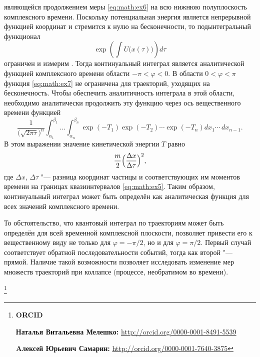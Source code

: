 являющейся продолжением меры \eqref{eq:math:ex6} на всю нижнюю полуплоскость комплексного времени. Поскольку потенциальная энергия является непрерывной функцией координат и стремится к нулю на бесконечности, то подынтегральный функционал $$\displaystyle \exp\left(\int U\bigl(x(\tau)\bigr)\right)d\tau$$ ограничен и измерим \cite{bib:KPT}. Тогда континуальный интеграл является аналитической функцией комплексного времени области $-\pi<\varphi<0 $. В области $0<\varphi<\pi$ функция \eqref{eq:math:ex7} не ограничена для траекторий, уходящих на бесконечность. 
Чтобы обеспечить аналитичность интеграла в этой области, необходимо аналитически продолжить эту функцию через ось вещественного времени функцией
\begin{equation*}
\frac{1}{\bigl(\sqrt{2\pi\tau}\bigr)^{n}}\int_{\alpha_{1}}^{\beta_{1}}...
\int_{\alpha_{n}}^{\beta_{n}}\exp(-T_{1})\exp(-T_{2})
\cdots\exp(-T_{n})dx_{1}\cdots\,dx_{n-1}.
\end{equation*}
В этом выражении значение кинетической энергии $T$ равно $$\displaystyle \frac{m}{2}\Bigl(\frac{\Delta x}{\Delta \tau}\Bigr)^{2},$$ 
где $\Delta x$, $\Delta \tau$ "--- разница координат частицы и соответствующих им моментов времени на границах квазиинтервалов  \eqref{eq:math:ex5}. Таким образом, континуальный интеграл может быть определён как аналитическая функция для всех значений комплексного времени.

\smallskip

 То обстоятельство, что квантовый интеграл по траекториям может быть определён для всей временной комплексной плоскости, позволяет привести его к вещественному виду не только для  $\varphi=-{\pi}/{2}$, но и для $\varphi={\pi}/{2}$. 
Первый случай соответствует обратной последовательности событий, тогда как второй "--- прямой. Наличие такой возможности позволяет исследовать изменение мер множеств траекторий при коллапсе (процессе, необратимом во времени).

\thanks{{\bf ORCID}

{\bf Наталья Витальевна Мелешко:} \url{http://orcid.org/0000-0001-8491-5539}

{\bf Aлексей Юрьевич Самарин:} \url{http://orcid.org/0000-0001-7640-3875}

}


\RusRef

\pagebreak


